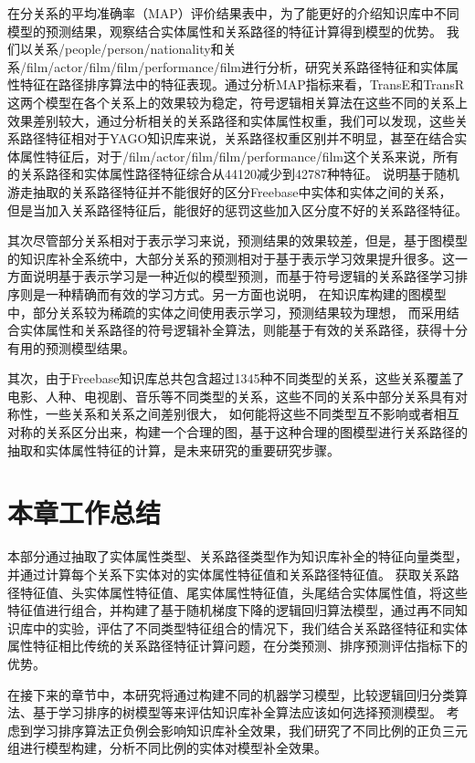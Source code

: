 在分关系的平均准确率（MAP）评价结果表中，为了能更好的介绍知识库中不同模型的预测结果，观察结合实体属性和关系路径的特征计算得到模型的优势。
我们以关系/people/person/nationality和关系/film/actor/film/film/performance/film进行分析，研究关系路径特征和实体属性特征在路径排序算法中的特征表现。通过分析MAP指标来看，TransE和TransR这两个模型在各个关系上的效果较为稳定，符号逻辑相关算法在这些不同的关系上效果差别较大，通过分析相关的关系路径和实体属性权重，我们可以发现，这些关系路径特征相对于YAGO知识库来说，关系路径权重区别并不明显，甚至在结合实体属性特征后，对于/film/actor/film/film/performance/film这个关系来说，所有的关系路径和实体属性路径特征综合从44120减少到42787种特征。
说明基于随机游走抽取的关系路径特征并不能很好的区分Freebase中实体和实体之间的关系，
但是当加入关系路径特征后，能很好的惩罚这些加入区分度不好的关系路径特征。

其次尽管部分关系相对于表示学习来说，预测结果的效果较差，但是，基于图模型的知识库补全系统中，大部分关系的预测相对于基于表示学习效果提升很多。这一方面说明基于表示学习是一种近似的模型预测，而基于符号逻辑的关系路径学习排序则是一种精确而有效的学习方式。另一方面也说明，
在知识库构建的图模型中，部分关系较为稀疏的实体之间使用表示学习，预测结果较为理想，
而采用结合实体属性和关系路径的符号逻辑补全算法，则能基于有效的关系路径，获得十分有用的预测模型结果。

其次，由于Freebase知识库总共包含超过1345种不同类型的关系，这些关系覆盖了电影、人种、电视剧、音乐等不同类型的关系，这些不同的关系中部分关系具有对称性，一些关系和关系之间差别很大，
如何能将这些不同类型互不影响或者相互对称的关系区分出来，构建一个合理的图，基于这种合理的图模型进行关系路径的抽取和实体属性特征的计算，是未来研究的重要研究步骤。

\section{本章工作总结}
本部分通过抽取了实体属性类型、关系路径类型作为知识库补全的特征向量类型，并通过计算每个关系下实体对的实体属性特征值和关系路径特征值。
获取关系路径特征值、头实体属性特征值、尾实体属性特征值，头尾结合实体属性值，将这些特征值进行组合，并构建了基于随机梯度下降的逻辑回归算法模型，通过再不同知识库中的实验，评估了不同类型特征组合的情况下，我们结合关系路径特征和实体属性特征相比传统的关系路径特征计算问题，在分类预测、排序预测评估指标下的优势。

在接下来的章节中，本研究将通过构建不同的机器学习模型，比较逻辑回归分类算法、基于学习排序的树模型等来评估知识库补全算法应该如何选择预测模型。
考虑到学习排序算法正负例会影响知识库补全效果，我们研究了不同比例的正负三元组进行模型构建，分析不同比例的实体对模型补全效果。 